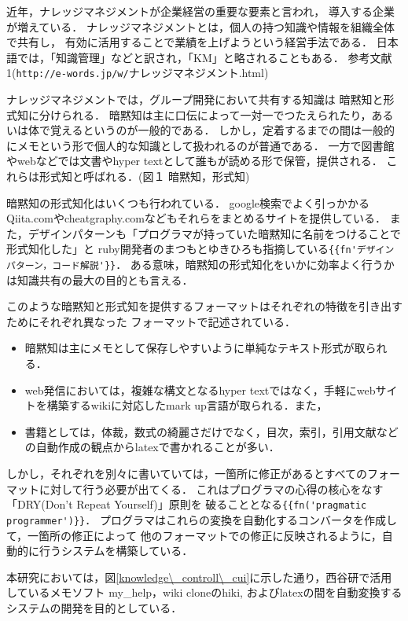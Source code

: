 近年，ナレッジマネジメントが企業経営の重要な要素と言われ，
導入する企業が増えている．
ナレッジマネジメントとは，個人の持つ知識や情報を組織全体で共有し，
有効に活用することで業績を上げようという経営手法である．
日本語では，「知識管理」などと訳され，「KM」と略されることもある．
参考文献1(\verb|http://e-words.jp/w/|ナレッジマネジメント.html)

ナレッジマネジメントでは，グループ開発において共有する知識は
暗黙知と形式知に分けられる．
暗黙知は主に口伝によって一対一でつたえられたり，あるいは体で覚えるというのが一般的である．
しかし，定着するまでの間は一般的にメモという形で個人的な知識として扱われるのが普通である．
一方で図書館やwebなどでは文書やhyper textとして誰もが読める形で保管，提供される．
これらは形式知と呼ばれる．(図１ 暗黙知，形式知)

暗黙知の形式知化はいくつも行われている．
google検索でよく引っかかるQiita.comやcheatgraphy.comなどもそれらをまとめるサイトを提供している．
また，デザインパターンも「プログラマが持っていた暗黙知に名前をつけることで形式知化した」と
ruby開発者のまつもとゆきひろも指摘している\verb|{{fn'デザインパターン，コード解説'}}|．
ある意味，暗黙知の形式知化をいかに効率よく行うかは知識共有の最大の目的とも言える．

このような暗黙知と形式知を提供するフォーマットはそれぞれの特徴を引き出すためにそれぞれ異なった
フォーマットで記述されている．

\begin{itemize}
\item 暗黙知は主にメモとして保存しやすいように単純なテキスト形式が取られる．
\item web発信においては，複雑な構文となるhyper textではなく，手軽にwebサイトを構築するwikiに対応したmark up言語が取られる．また，
\item 書籍としては，体裁，数式の綺麗さだけでなく，目次，索引，引用文献などの自動作成の観点からlatexで書かれることが多い．
\end{itemize}
しかし，それぞれを別々に書いていては，一箇所に修正があるとすべてのフォーマットに対して行う必要が出てくる．
これはプログラマの心得の核心をなす「DRY(Don't Repeat Yourself)」原則を
破ることとなる\verb|{{fn('pragmatic programmer')}}|．
プログラマはこれらの変換を自動化するコンバータを作成して，一箇所の修正によって
他のフォーマットでの修正に反映されるように，自動的に行うシステムを構築している．

本研究においては，図\ref{knowledge\_controll\_cui}に示した通り，西谷研で活用しているメモソフト
my\_help，wiki cloneのhiki, およびlatexの間を自動変換するシステムの開発を目的としている．


